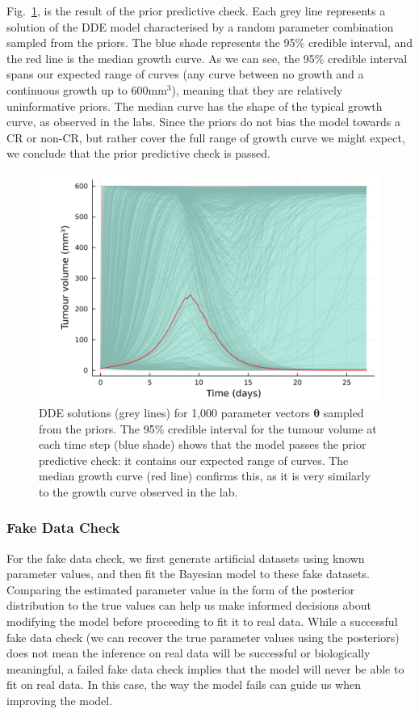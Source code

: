 \documentclass[11pt]{article}
\begin{document}
Fig.~\ref{fig:ppc_1}, is the result of the prior predictive check. Each grey line represents a solution of the DDE model characterised by a random parameter combination sampled from the priors. The blue shade represents the 95\% credible interval, and the red line is the median growth curve. As we can see, the 95\% credible interval spans our expected range of curves (any curve between no growth and a continuous growth up to 600mm$^3$), meaning that they are relatively uninformative priors. The median curve has the shape of the typical growth curve, as observed in the labs. Since the priors do not bias the model towards a CR or non-CR, but rather cover the full range of growth curve we might expect, we conclude that the prior predictive check is passed.
    \begin{figure}[!ht]
        \centering\includegraphics[scale=0.1]{LOGprout.png}
        \caption{DDE solutions (grey lines) for 1,000 parameter vectors $\boldsymbol{\theta}$ sampled from the priors. The 95\% credible interval for the tumour volume at each time step (blue shade) shows that the model passes the prior predictive check: it contains our expected range of curves. The median growth curve (red line) confirms this, as it is very similarly to the growth curve observed in the lab.}
        \label{fig:ppc_1}
    \end{figure}


\subsubsection{Fake Data Check}
For the fake data check, we first generate artificial datasets using known parameter values, and then fit the Bayesian model to these fake datasets. Comparing the estimated parameter value in the form of the posterior distribution to the true values can help us make informed decisions about modifying the model before proceeding to fit it to real data. While a successful fake data check (we can recover the true parameter values using the posteriors) does not mean the inference on real data will be successful or biologically meaningful, a failed fake data check implies that the model will never be able to fit on real data. In this case, the way the model fails can guide us when improving the model.
\end{document}
